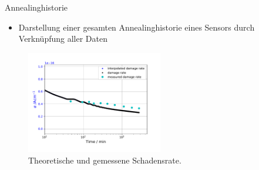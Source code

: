 \documentclass[aspectratio=1610, 9pt]{beamer}
\begin{document}
\begin{frame}{Annealinghistorie}
  \begin{itemize}
    \item Darstellung einer gesamten Annealinghistorie eines Sensors durch Verknüpfung aller Daten
  \end{itemize}

  \begin{figure}
      \includegraphics[width=0.53\textwidth]{images/damage_ohne_temperatur.PDF}
  \caption{Theoretische und gemessene Schadensrate.}
  \end{figure}
\end{frame}
\end{document}
